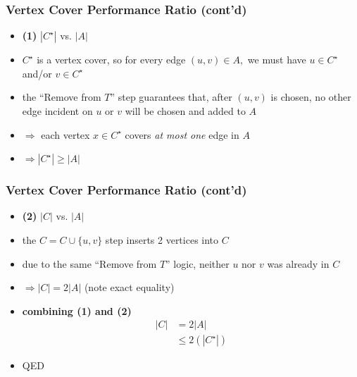 \documentclass[10pt,aspectratio=169]{beamer}
\begin{document}
\begin{frame} \frametitle{Vertex Cover Performance Ratio (cont'd)}
\begin{itemize}
  \item \textbf{(1)} $|C^\star|$ vs. $|A|$
  \item $C^\star$ is a vertex cover, so for every edge $(u, v) \in A,$ we must have
    $u \in C^\star$ and/or $v \in C^\star$
  \item the ``Remove from $T$'' step guarantees that, after $(u, v)$ is chosen,
    no other edge incident on $u$ or $v$ will be chosen and added to $A$
  \item $\Rightarrow$ each vertex $x \in C^\star$ covers \emph{at most one} edge in $A$
  \item $\Rightarrow |C^\star| \geq |A|$
\end{itemize}
\end{frame}

\begin{frame} \frametitle{Vertex Cover Performance Ratio (cont'd)}
\begin{itemize}
  \item \textbf{(2)} $|C|$ vs. $|A|$
  \item the $C = C \cup \{u, v \}$ step inserts 2 vertices into $C$
  \item  due to the same ``Remove from $T$'' logic, neither $u$ nor $v$ was already
    in $C$
  \item $\Rightarrow |C| = 2|A|$ (note exact equality)
  \item \textbf{combining (1) and (2)}
  \begin{align*}
    |C| &= 2|A| \\
    & \leq 2(|C^\star|)
  \end{align*}
  \item QED
\end{itemize}
\end{frame}
\end{document}
